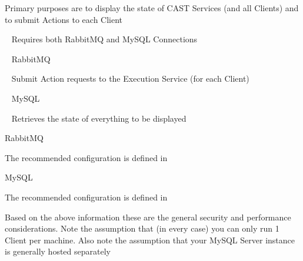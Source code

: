\begin{DoxyItemize}
\item Primary purposes are to display the state of CAST Services (and all Clients) and to submit Actions to each Client
\item ~ Requires both Rabbit\+MQ and My\+SQL Connections
\item ~ Rabbit\+MQ
\item ~ Submit Action requests to the Execution Service (for each Client)
\item ~ My\+SQL
\item ~ Retrieves the state of everything to be displayed
\end{DoxyItemize}

Rabbit\+MQ

The recommended configuration is defined in 

My\+SQL

The recommended configuration is defined in 

Based on the above information these are the general security and performance considerations. Note the assumption that (in every case) you can only run 1 Client per machine. Also note the assumption that your My\+SQL Server instance is generally hosted separately


